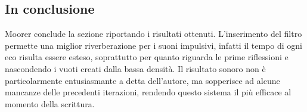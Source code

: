 \subsection{In conclusione}
Moorer conclude la sezione riportando i risultati ottenuti. L’inserimento del filtro permette una miglior riverberazione per i suoni impulsivi, infatti il tempo di ogni eco risulta essere esteso, soprattutto per quanto riguarda le prime riflessioni e nascondendo i vuoti creati dalla bassa densità.
Il risultato sonoro non è particolarmente entusiasmante a detta dell’autore, ma sopperisce ad alcune mancanze delle precedenti iterazioni, rendendo questo sistema il più efficace al momento della scrittura.
